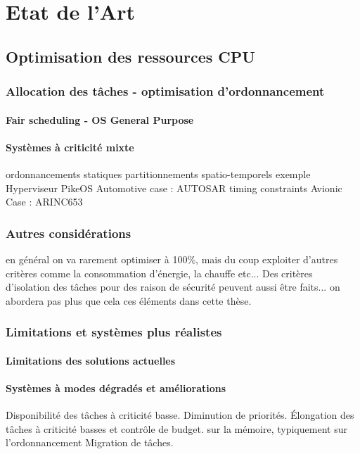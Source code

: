 \documentclass[french, a4paper, 11pt, twoside, pdftex]{StyleThese}
\begin{document}
\setcounter{chapter}{2} %
\dominitoc
\faketableofcontents
\fi

\chapter{Etat de l'Art}
\minitoc

\section{Optimisation des ressources CPU}
    \subsection{Allocation des tâches - optimisation d'ordonnancement}
    
        \subsubsection{Fair scheduling - OS General Purpose}
        \subsubsection{Systèmes à criticité mixte}
                ordonnancements statiques
        partitionnements spatio-temporels
            exemple Hyperviseur PikeOS
        Automotive case : AUTOSAR
            timing constraints
        Avionic Case : ARINC653
    \subsection{Autres considérations}
        en général on va rarement optimiser à 100\%, mais du coup exploiter d'autres critères comme la consommation d'énergie, la chauffe etc... Des critères d'isolation des tâches pour des raison de sécurité peuvent aussi être faits... on abordera pas plus que cela ces éléments dans cette thèse.
\subsection{Limitations et systèmes plus réalistes}
    \subsubsection{Limitations des solutions actuelles}
    \subsubsection{Systèmes à modes dégradés et améliorations}
    Disponibilité des tâches à criticité basse.
    Diminution de priorités.
    Élongation des tâches à criticité basses et contrôle de budget. sur la mémoire, \cite{blin_vers_2017} typiquement
            sur l'ordonnancement
    Migration de tâches.



\ifdefined{}
\else


\end{document}

